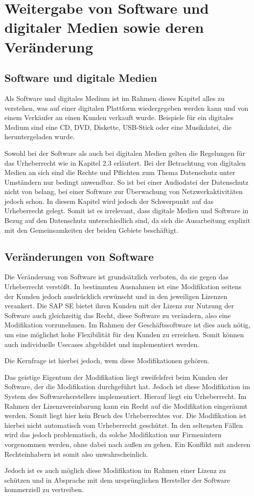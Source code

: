 \chapter{Weitergabe von Software und digitaler Medien sowie deren Veränderung}
\section{Software und digitale Medien}
Als Software und digitales Medium ist im Rahmen dieses Kapitel alles zu verstehen, was auf einer digitalen Plattform wiedergegeben werden kann und von einem Verkäufer an einen Kunden verkauft wurde.
Beispiele für ein digitales Medium sind eine CD, DVD, Diskette, USB-Stick oder eine Musikdatei, die heruntergeladen wurde.\par
Sowohl bei der Software als auch bei digitalen Medien gelten die Regelungen für das Urheberrecht wie in Kapitel 2.3 erläutert.
Bei der Betrachtung von digitalen Medien an sich sind die Rechte und Pflichten zum Thema Datenschutz unter Umständern nur bedingt anwendbar.
So ist bei einer Audiodatei der Datenschutz nicht von belang, bei einer Software zur Überwachung von Netzwerkaktivitäten jedoch schon.
In diesem Kapitel wird jedoch der Schwerpunkt auf das Urheberrecht gelegt.
Somit ist es irrelevant, dass digitale Medien und Software in Bezug auf den Datenschutz unterschiedlich sind, da sich die Ausarbeitung explizit mit den Gemeinsamkeiten der beiden Gebiete beschäftigt.
\section{Veränderungen von Software}
Die Veränderung von Software ist grundsätzlich verboten, da sie gegen das Urheberrecht verstößt.
In bestimmten Ausnahmen ist eine Modifikation seitens der Kunden jedoch ausdrücklich erwünscht und in den jeweiligen Lizenzen verankert.
Die SAP SE bietet ihren Kunden mit der Lizenz zur Nutzung der Software auch gleichzeitig das Recht, diese Software zu verändern, also eine Modifikation vorzunehmen.
Im Rahmen der Geschäftssoftware ist dies auch nötig, um eine möglichst hohe Flexibilität für den Kunden zu erreichen.
Somit können auch individuelle Usecases abgebildet und implementiert werden.\par
Die Kernfrage ist hierbei jedoch, wem diese Modifikationen gehören.\par
Das geistige Eigentum der Modifikation liegt zweifelsfrei beim Kunden der Software, der die Modifikation durchgeführt hat.
Jedoch ist diese Modifikation im System des Softwareherstellers implementiert.
Hierauf liegt ein Urheberrecht.
Im Rahmen der Lizenzvereinbarung kann ein Recht auf die Modifikation eingeräumt werden.
Somit liegt hier kein Bruch des Urheberrechtes vor.
Die Modifikation ist hierbei nicht automatisch vom Urheberrecht geschützt.
In den seltensten Fällen wird das jedoch problematisch, da solche Modifikation nur Firmenintern vorgenommen werden, ohne dabei nach außen zu gehen.
Ein Konflikt mit anderen Rechteinhabern ist somit also unwahrscheinlich.\par
Jedoch ist es auch möglich diese Modifikation im Rahmen einer Lizenz zu schützen und in Absprache mit dem ursprünglichen Hersteller der Software kommerziell zu vertreiben.
